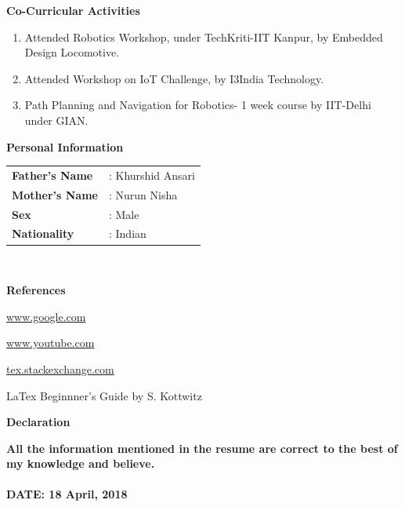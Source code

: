 \documentclass[a4paper,12pt,final]{memoir}
\newcommand{\Sep}{\vspace{1.5em}}
\newcommand{\SmallSep}{\vspace{0.5em}}
\newcommand{\CVSection}[1]
	{\Large\textbf{#1}\par
	\SmallSep\normalsize\normalfont}
\newcommand{\CVItem}[1]
	{\textbf{\color{RoyalBlue} #1}}
\begin{document}
\Sep
\CVSection{Co-Curricular Activities}
\begin{enumerate}[1.]
\item Attended Robotics Workshop, under TechKriti-IIT Kanpur, by Embedded Design Locomotive.
\item Attended Workshop on IoT Challenge, by I3India Technology.
\item Path Planning and Navigation for Robotics- 1 week course by IIT-Delhi under GIAN.
\end{enumerate}
\Sep
\CVSection{Personal Information}
\begin{tabular}{l l}
\CVItem{Father's Name} & : Khurshid Ansari\\
\CVItem{Mother's Name} & : Nurun Nisha \\
\CVItem{Sex} & : Male \\
\CVItem{Nationality} & : Indian\\

\end{tabular}\\
\Sep

\CVSection{References}
\begin{compactitem}[\color{RoyalBlue}$\circ$]
\item\url{www.google.com}
\item\url{www.youtube.com}
\item\url{tex.stackexchange.com}
\item\noindent LaTex Beginnner's Guide by S. Kottwitz	
\end{compactitem}
\Sep

\CVSection{Declaration}
\textbf{All the information mentioned in the resume are correct to the best of my knowledge and believe.}\\
\Sep
\\
\CVItem{DATE: 18 April, 2018}

\end{document}
